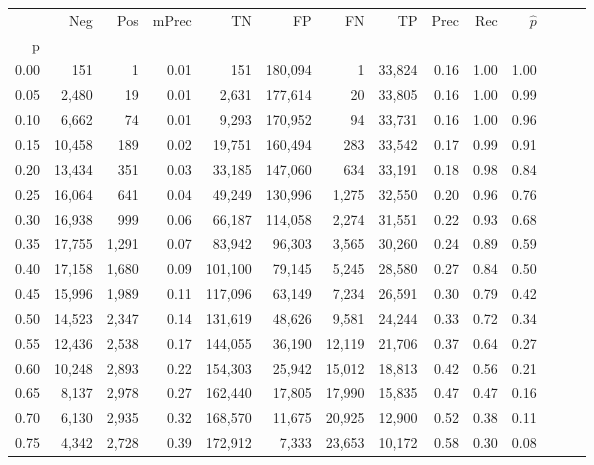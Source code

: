 \begin{tabular}{rrrrrrrrrrrrrr}
\toprule
{} &     Neg &    Pos & mPrec &       TN &       FP &      FN &      TP &  Prec &   Rec & $\hat{p}$ \\
p    &         &        &       &          &          &         &         &       &       &           \\
\midrule
0.00 &     151 &      1 &  0.01 &      151 &  180,094 &       1 &  33,824 &  0.16 &  1.00 &      1.00 \\
0.05 &   2,480 &     19 &  0.01 &    2,631 &  177,614 &      20 &  33,805 &  0.16 &  1.00 &      0.99 \\
0.10 &   6,662 &     74 &  0.01 &    9,293 &  170,952 &      94 &  33,731 &  0.16 &  1.00 &      0.96 \\
0.15 &  10,458 &    189 &  0.02 &   19,751 &  160,494 &     283 &  33,542 &  0.17 &  0.99 &      0.91 \\
0.20 &  13,434 &    351 &  0.03 &   33,185 &  147,060 &     634 &  33,191 &  0.18 &  0.98 &      0.84 \\
0.25 &  16,064 &    641 &  0.04 &   49,249 &  130,996 &   1,275 &  32,550 &  0.20 &  0.96 &      0.76 \\
0.30 &  16,938 &    999 &  0.06 &   66,187 &  114,058 &   2,274 &  31,551 &  0.22 &  0.93 &      0.68 \\
0.35 &  17,755 &  1,291 &  0.07 &   83,942 &   96,303 &   3,565 &  30,260 &  0.24 &  0.89 &      0.59 \\
0.40 &  17,158 &  1,680 &  0.09 &  101,100 &   79,145 &   5,245 &  28,580 &  0.27 &  0.84 &      0.50 \\
0.45 &  15,996 &  1,989 &  0.11 &  117,096 &   63,149 &   7,234 &  26,591 &  0.30 &  0.79 &      0.42 \\
0.50 &  14,523 &  2,347 &  0.14 &  131,619 &   48,626 &   9,581 &  24,244 &  0.33 &  0.72 &      0.34 \\
0.55 &  12,436 &  2,538 &  0.17 &  144,055 &   36,190 &  12,119 &  21,706 &  0.37 &  0.64 &      0.27 \\
0.60 &  10,248 &  2,893 &  0.22 &  154,303 &   25,942 &  15,012 &  18,813 &  0.42 &  0.56 &      0.21 \\
0.65 &   8,137 &  2,978 &  0.27 &  162,440 &   17,805 &  17,990 &  15,835 &  0.47 &  0.47 &      0.16 \\
0.70 &   6,130 &  2,935 &  0.32 &  168,570 &   11,675 &  20,925 &  12,900 &  0.52 &  0.38 &      0.11 \\
0.75 &   4,342 &  2,728 &  0.39 &  172,912 &    7,333 &  23,653 &  10,172 &  0.58 &  0.30 &      0.08 \\

\end{tabular}
